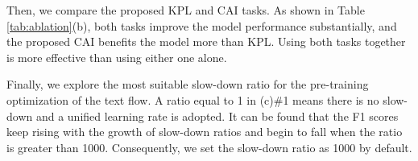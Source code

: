 \documentclass[11pt]{article}
\begin{document}
Then, we compare the proposed KPL and CAI tasks. As shown in Table \ref{tab:ablation}(b), both tasks improve the model performance substantially, and the proposed CAI benefits the model more than KPL. 
Using both tasks together is more effective than using either one alone.

Finally, we explore the most suitable slow-down ratio for the pre-training optimization of the text flow. 
A ratio equal to 1 in (c)\#1 means there is no slow-down and a unified learning rate is adopted.
It can be found that the F1 scores  keep rising with the growth of slow-down ratios and begin to fall when the ratio is greater than 1000. Consequently, we set the slow-down ratio as 1000 by default.



\begin{table}[!]
\centering
{}
\caption{Comparison on the semantic entity recognition (SER)  task of EPHOIE \cite{vies} dataset. ``ZH-R”  is short for  Chinese RoBERTa. \cite{blstmcrf};\cite{qian2019graphie};\cite{gcn};\cite{TRIE};\cite{vies};\cite{tang2021matchvie};\cite{tcpn};\cite{cui-etal-2020-revisiting}.}
\label{tab:ephoie}
\end{table}
\end{document}
